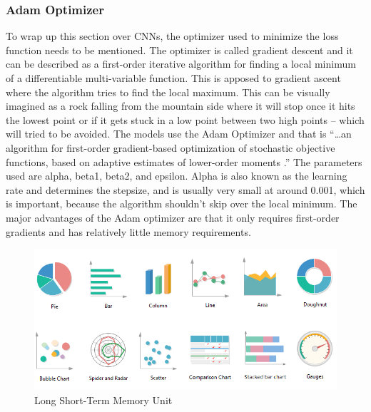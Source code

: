 \documentclass[12pt]{article}
\begin{document}
            \subsubsection{Adam Optimizer}

                To wrap up this section over CNNs, the optimizer used to minimize the loss function needs to be mentioned. 
                The optimizer is called gradient descent and it can be described as a first-order iterative algorithm 
                for finding a local minimum of a differentiable multi-variable function. 
                This is apposed to gradient ascent where the algorithm tries to find the local maximum. 
                This can be visually imagined as a rock falling from the mountain side 
                where it will stop once it hits the lowest point or if it gets stuck in a low point between two high points -- 
                which will tried to be avoided. The models use the Adam Optimizer and that is “…an algorithm 
                for first-order gradient-based optimization of stochastic objective functions, based on adaptive estimates 
                of lower-order moments \cite{kingma2015}.” The parameters used are alpha, beta1, beta2, and epsilon. 
                Alpha is also known as the learning rate and determines the stepsize, 
                and is usually very small at around 0.001, which is important, 
                because the algorithm shouldn’t skip over the local minimum. 
                The major advantages of the Adam optimizer are that it only requires first-order gradients 
                and has relatively little memory requirements.

                \begin{figure}[ht]
                
                    \begin{center}

                        \includegraphics[scale=0.5]{types-of-graphs.png}
                        \caption{Long Short-Term Memory Unit \cite{zhang2020}}
            
                    \end{center}
                    
                \end{figure}
\end{document}
